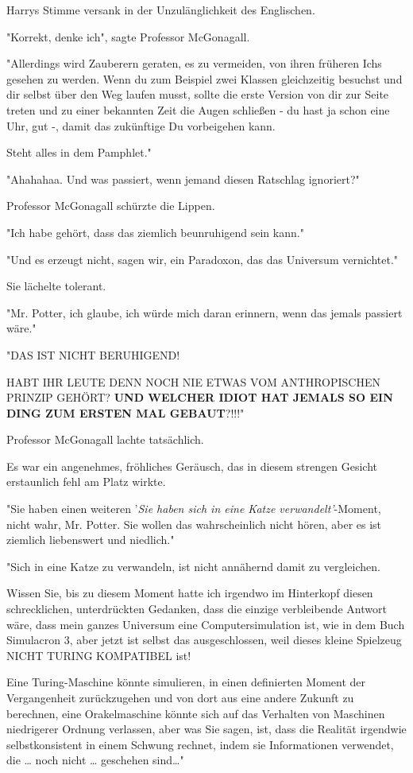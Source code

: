 {Harrys Stimme versank in der Unzulänglichkeit des Englischen.

"Korrekt, denke ich", sagte Professor McGonagall.

"Allerdings wird Zauberern geraten, es zu vermeiden, von ihren früheren Ichs gesehen zu werden. Wenn du zum Beispiel zwei Klassen gleichzeitig besuchst und dir selbst über den Weg laufen musst, sollte die erste Version von dir zur Seite treten und zu einer bekannten Zeit die Augen schließen - du hast ja schon eine Uhr, gut -, damit das zukünftige Du vorbeigehen kann.

Steht alles in dem Pamphlet."

"Ahahahaa. Und was passiert, wenn jemand diesen Ratschlag ignoriert?"

Professor McGonagall schürzte die Lippen.

"Ich habe gehört, dass das ziemlich beunruhigend sein kann."

"Und es erzeugt nicht, sagen wir, ein Paradoxon, das das Universum vernichtet."

Sie lächelte tolerant.

"Mr. Potter, ich glaube, ich würde mich daran erinnern, wenn das jemals passiert wäre."

"DAS IST NICHT BERUHIGEND!

HABT IHR LEUTE DENN NOCH NIE ETWAS VOM ANTHROPISCHEN PRINZIP GEHÖRT? \textbf{UND WELCHER IDIOT HAT JEMALS SO EIN DING ZUM ERSTEN MAL GEBAUT}?!!!"

Professor McGonagall lachte tatsächlich.

Es war ein angenehmes, fröhliches Geräusch, das in diesem strengen Gesicht erstaunlich fehl am Platz wirkte.

"Sie haben einen weiteren '\emph{Sie haben sich in eine Katze verwandelt'}-Moment, nicht wahr, Mr. Potter. Sie wollen das wahrscheinlich nicht hören, aber es ist ziemlich liebenswert und niedlich."

"Sich in eine Katze zu verwandeln, ist nicht annähernd damit zu vergleichen.

Wissen Sie, bis zu diesem Moment hatte ich irgendwo im Hinterkopf diesen schrecklichen, unterdrückten Gedanken, dass die einzige verbleibende Antwort wäre, dass mein ganzes Universum eine Computersimulation ist, wie in dem Buch Simulacron 3, aber jetzt ist selbst das ausgeschlossen, weil dieses kleine Spielzeug NICHT TURING KOMPATIBEL ist!

Eine Turing-Maschine könnte simulieren, in einen definierten Moment der Vergangenheit zurückzugehen und von dort aus eine andere Zukunft zu berechnen, eine Orakelmaschine könnte sich auf das Verhalten von Maschinen niedrigerer Ordnung verlassen, aber was Sie sagen, ist, dass die Realität irgendwie selbstkonsistent in einem Schwung rechnet, indem sie Informationen verwendet, die … noch nicht … geschehen sind…"

}
